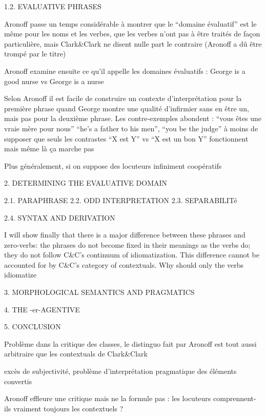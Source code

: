 \documentclass[a4paper,12pt]{article}
\begin{document}
 
 1.2. EVALUATIVE PHRASES
 
 
 Aronoff passe un temps considérable à montrer que le ``domaine évaluatif'' est le même pour les noms et les verbes, que les verbes n'ont pas 
 à être traités de façon particulière, mais Clark\&Clark ne disent nulle part le contraire (Aronoff a dû être trompé par le titre) 
 
   
Aronoff examine ensuite ce qu'il appelle les domaines évaluatifs : 
George is a good nurse vs George is a nurse

Selon Aronoff il est facile de construire un contexte d'interprétation pour la première phrase quand George montre une qualité d'infirmier sans en être
un, mais pas pour la deuxième phrase. Les contre-exemples abondent : 
``vous êtes une vraie mère pour nous'' ``he's a father to his men'', ``you be the judge'' 
à moins de supposer que seuls les contrastes ``X est Y'' vs ``X est un bon Y'' fonctionnent mais même là ça marche pas

Plus généralement, si on suppose des locuteurs infiniment coopératifs 
 
 2. DETERMINING THE EVALUATIVE DOMAIN
 
 2.1. PARAPHRASE
 2.2. ODD INTERPRETATION
 2.3. SEPARABILITé
 
 2.4. SYNTAX AND DERIVATION
 
 I will show finally that there is a major difference between these phrases
and zero-verbs: the phrases do not become fixed in their meanings as the verbs do;
they do not follow C&C's continuum of idiomatization. This difference cannot be
accounted for by C&C's category of contextuals. Why should only the verbs idiomatize

 3. MORPHOLOGICAL SEMANTICS AND PRAGMATICS
 
 4. THE -er-AGENTIVE
 
 5. CONCLUSION
  
 Problème dans la critique des classes, le distinguo fait par Aronoff est tout aussi arbitraire que les contextuals de Clark\&Clark 
 
 excès de subjectivité, problème d'interprétation pragmatique des éléments convertis
 
 Aronoff effleure une critique mais ne la formule pas : les locuteurs comprennent-ils vraiment toujours les contextuels ?
 
  
\end{document}
